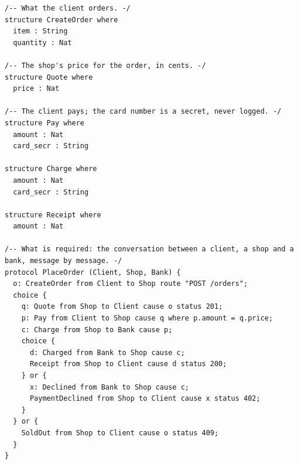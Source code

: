 \begin{lstlisting}[language={},basicstyle=\ttfamily\footnotesize,breaklines=true]
/-- What the client orders. -/
structure CreateOrder where
  item : String
  quantity : Nat

/-- The shop's price for the order, in cents. -/
structure Quote where
  price : Nat

/-- The client pays; the card number is a secret, never logged. -/
structure Pay where
  amount : Nat
  card_secr : String

structure Charge where
  amount : Nat
  card_secr : String

structure Receipt where
  amount : Nat

/-- What is required: the conversation between a client, a shop and a bank, message by message. -/
protocol PlaceOrder (Client, Shop, Bank) {
  o: CreateOrder from Client to Shop route "POST /orders";
  choice {
    q: Quote from Shop to Client cause o status 201;
    p: Pay from Client to Shop cause q where p.amount = q.price;
    c: Charge from Shop to Bank cause p;
    choice {
      d: Charged from Bank to Shop cause c;
      Receipt from Shop to Client cause d status 200;
    } or {
      x: Declined from Bank to Shop cause c;
      PaymentDeclined from Shop to Client cause x status 402;
    }
  } or {
    SoldOut from Shop to Client cause o status 409;
  }
}
\end{lstlisting}
